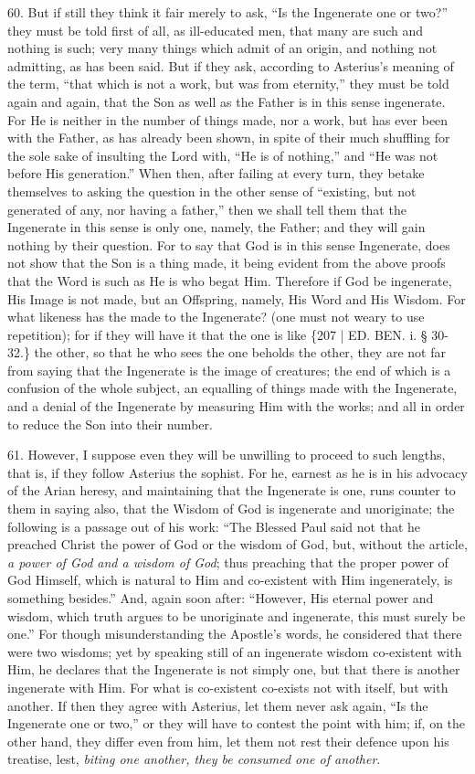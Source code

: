60. But if still they think it
fair merely to ask, ``Is the Ingenerate one or two?'' they must be told
first of all, as ill-educated men, that many are such and nothing is
such; very many things which admit of an origin, and nothing not
admitting, as has been said. But if they ask, according to Asterius's
meaning of the term, ``that which is not a work, but was from eternity,''
they must be told again and again, that the Son as well as the Father
is in this sense ingenerate. For He is neither in the number of things
made, nor a work, but has ever been with the Father, as has already
been shown, in spite of their much shuffling for the sole sake of
insulting the Lord with, ``He is of nothing,'' and ``He was not before
His generation.'' When then, after failing at every turn, they betake
themselves to asking the question in the other sense of ``existing, but
not generated of any, nor having a father,'' then we shall tell them
that the Ingenerate in this sense is only one, namely, the Father; and
they will gain nothing by their question. For to say that God is in
this sense Ingenerate, does not show that the Son is a thing made, it
being evident from the above proofs that the Word is such as He is who
begat Him. Therefore if God be ingenerate, His Image is not made, but
an Offspring, namely, His Word and His Wisdom. For what likeness has
the made to the Ingenerate? (one must not weary to use repetition);
for if they will have it that the one is like \{207 | ED. BEN. i. § 30-32.\}
the other, so that he who sees the one beholds the other, they are not
far from saying that the Ingenerate is the image of creatures; the end
of which is a confusion of the whole subject, an equalling of things
made with the Ingenerate, and a denial of the Ingenerate by measuring
Him with the works; and all in order to reduce the Son into their
number.

61. However, I suppose even
they will be unwilling to proceed to such lengths, that is, if they
follow Asterius the sophist. For he, earnest as he is in his advocacy
of the Arian heresy, and maintaining that the Ingenerate is one, runs
counter to them in saying also, that the Wisdom of God is ingenerate
and unoriginate; the following is a passage out of his work: ``The
Blessed Paul said not that he preached Christ the power of God or the
wisdom of God, but, without the article, \emph{a power of God and a
wisdom of God}; thus preaching that the proper power of God
Himself, which is natural to Him and co-existent with Him ingenerately,
is something besides.'' And, again soon after: ``However, His eternal
power and wisdom, which truth argues to be unoriginate and ingenerate,
this must surely be one.'' For though misunderstanding the Apostle's
words, he considered that there were two wisdoms; yet by speaking
still of an ingenerate wisdom co-existent with Him, he declares that
the Ingenerate is not simply one, but that there is another ingenerate
with Him. For what is co-existent co-exists not with itself, but with
another. If then they agree with Asterius, let them never ask again, ``Is
the Ingenerate one or two,'' or they will have to contest the point
with him; if, on the other hand, they differ even from him, let them
not rest their defence upon his treatise, lest, \emph{biting one another,
they be consumed one of another}.

